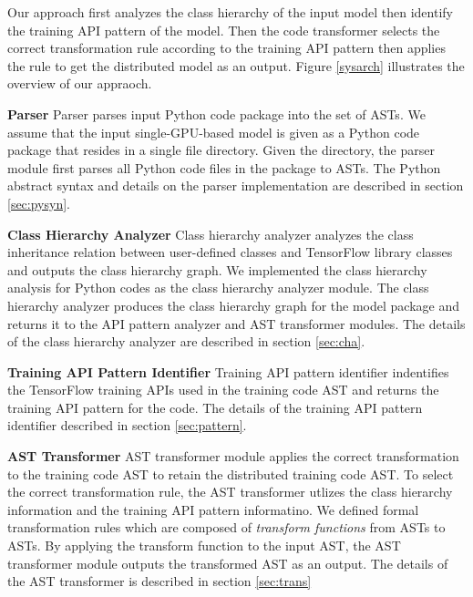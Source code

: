 Our approach first analyzes the class hierarchy of the input model then
identify the training API pattern of the model.
Then the code transformer selects the correct transformation rule according
to the training API pattern then applies the rule to get the distributed
model as an output.
Figure \ref{sysarch} illustrates the overview of our appraoch.

\textbf{Parser}
Parser parses input Python code package
into the set of ASTs.
We assume that the input single-GPU-based model is given as a Python code
package that resides in a single file directory.
Given the directory, the parser module first parses all Python code files
in the package to ASTs.
The Python abstract syntax and details on the parser implementation
are described in section \ref{sec:pysyn}.

\textbf{Class Hierarchy Analyzer}
Class hierarchy analyzer analyzes the class inheritance relation
between user-defined classes and TensorFlow library classes and
outputs the class hierarchy graph.
We implemented the class hierarchy analysis
for Python codes as the class hierarchy analyzer module.
The class hierarchy analyzer produces the class hierarchy graph
for the model package and returns it to the API pattern analyzer and 
AST transformer modules. The details of the class hierarchy analyzer are
described in section \ref{sec:cha}.

\textbf{Training API Pattern Identifier}
Training API pattern identifier 
indentifies the TensorFlow training APIs used in the training code AST
and returns the training API pattern for the code.
The details of the training API pattern identifier described 
in section \ref{sec:pattern}.

\textbf{AST Transformer}
AST transformer module applies the correct transformation to the
training code AST to retain the distributed training code AST.
To select the correct transformation rule,
the AST transformer utlizes the class hierarchy information and
the training API pattern informatino.
We defined formal transformation rules which are composed of
\textit{transform functions} from ASTs to ASTs.
By applying the transform function to the input AST,
the AST transformer module outputs the transformed AST as an output.
The details of the AST transformer is described in section \ref{sec:trans}
